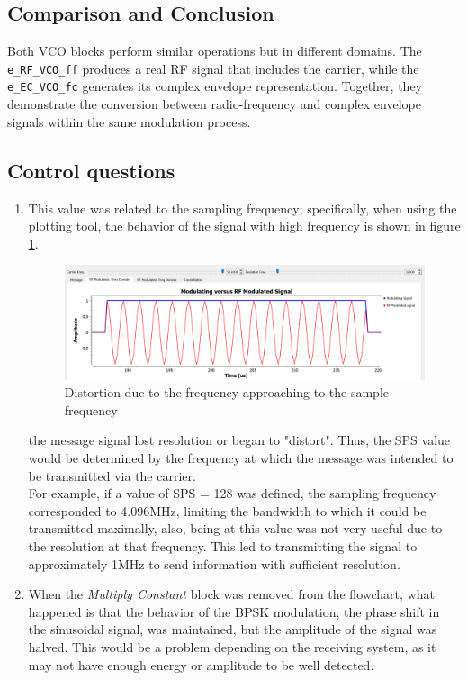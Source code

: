 \documentclass{journal}[IEEEtran, twocolumn]             %
\begin{document}
\begin{multicols}{2}
\subsection{Comparison and Conclusion}

Both VCO blocks perform similar operations but in different domains. 
The \texttt{e\_RF\_VCO\_ff} produces a real RF signal that includes the carrier, 
while the \texttt{e\_EC\_VCO\_fc} generates its complex envelope representation. 
Together, they demonstrate the conversion between radio-frequency and complex envelope 
signals within the same modulation process.


\subsection{Control questions}
\begin{enumerate}
    \item This value was related to the sampling frequency; specifically, when using the plotting tool, the behavior of the signal with high frequency is shown in figure \ref{fig:figB}.

    \begin{figure}[H]
    \centering
        \centering
        \includegraphics[width=0.6\columnwidth]{figs/VHF.png}
    \caption{Distortion due to the frequency approaching to the sample frequency}
    \label{fig:figB}
\end{figure}
    
    the message signal lost resolution or began to "distort".
    Thus, the SPS value would be determined by the frequency at which the message was intended to be transmitted via the carrier.\\
    
    For example, if a value of SPS = 128 was defined, the sampling frequency corresponded to 4.096MHz, limiting the bandwidth to which it could be transmitted maximally, also, being at this value was not very useful due to the resolution at that frequency. This led to transmitting the signal to approximately 1MHz to send information with sufficient resolution.

    \item When the \textit{Multiply Constant} block was removed from the flowchart, what happened is that the behavior of the BPSK modulation, the phase shift in the sinusoidal signal, was maintained, but the amplitude of the signal was halved. This would be a problem depending on the receiving system, as it may not have enough energy or amplitude to be well detected.


\end{enumerate}
\end{multicols}
\end{document}
